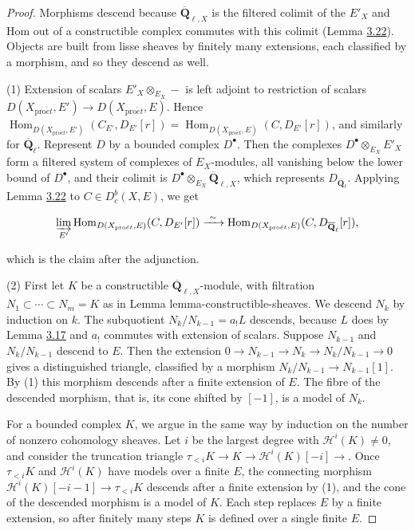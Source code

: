 \documentclass[11pt]{article}
\providecommand{\Dbc}{}\renewcommand{\Dbc}{D^b_c}
\providecommand{\Hom}{}\renewcommand{\Hom}{\operatorname{Hom}}
\providecommand{\QbarX}{}\renewcommand{\QbarX}{\overline{\mathbf Q}_{\ell,X}}
\begin{document}
\begin{proof}[{Proof}]\label{bp74}%
Morphisms descend because \(\QbarX\) is the filtered colimit of the \(E'_X\) and Hom out of a constructible complex commutes with this colimit (Lemma \hyperref[bp68]{3.22}). Objects are built from lisse sheaves by finitely many extensions, each classified by a morphism, and so they descend as well.

(1) Extension of scalars \(E'_X\otimes_{E_X}-\) is left adjoint to restriction of scalars \(D(X_{\mathrm{pro}\acute{e}t},E')\to D(X_{\mathrm{pro}\acute{e}t},E)\). Hence \(\Hom_{D(X_{\mathrm{pro}\acute{e}t},E')}(C_{E'},D_{E'}[r])=\Hom_{D(X_{\mathrm{pro}\acute{e}t},E)}(C,D_{E'}[r])\), and similarly for \(\overline{\mathbf Q}_\ell\). Represent \(D\) by a bounded complex \(D^\bullet\). Then the complexes \(D^\bullet\otimes_{E_X}E'_X\) form a filtered system of complexes of \(E_X\)-modules, all vanishing below the lower bound of \(D^\bullet\), and their colimit is \(D^\bullet\otimes_{E_X}\QbarX\), which represents \(D_{\overline{\mathbf Q}_\ell}\). Applying Lemma \hyperref[bp68]{3.22} to \(C\in\Dbc(X,E)\), we get

\[
\varinjlim_{E'}\Hom_{D(X_{\mathrm{pro}\acute{e}t},E)}(C,D_{E'}[r])
\xrightarrow{\ \sim\ }\Hom_{D(X_{\mathrm{pro}\acute{e}t},E)}(C,D_{\overline{\mathbf Q}_\ell}[r]),
\]

which is the claim after the adjunction.

(2) First let \(K\) be a constructible \(\QbarX\)-module, with filtration \(N_1\subset\cdots\subset N_m=K\) as in Lemma lemma-constructible-sheaves. We descend \(N_k\) by induction on \(k\). The subquotient \(N_k/N_{k-1}=a_!L\) descends, because \(L\) does by Lemma \hyperref[bp53]{3.17} and \(a_!\) commutes with extension of scalars. Suppose \(N_{k-1}\) and \(N_k/N_{k-1}\) descend to \(E\). Then the extension \(0\to N_{k-1}\to N_k\to N_k/N_{k-1}\to0\) gives a distinguished triangle, classified by a morphism \(N_k/N_{k-1}\to N_{k-1}[1]\). By (1) this morphism descends after a finite extension of \(E\). The fibre of the descended morphism, that is, its cone shifted by \([-1]\), is a model of \(N_k\).

For a bounded complex \(K\), we argue in the same way by induction on the number of nonzero cohomology sheaves. Let \(i\) be the largest degree with \(\mathcal H^i(K)\neq0\), and consider the truncation triangle \(\tau_{<i}K\to K\to\mathcal H^i(K)[-i]\to\). Once \(\tau_{<i}K\) and \(\mathcal H^i(K)\) have models over a finite \(E\), the connecting morphism \(\mathcal H^i(K)[-i-1]\to\tau_{<i}K\) descends after a finite extension by (1), and the cone of the descended morphism is a model of \(K\). Each step replaces \(E\) by a finite extension, so after finitely many steps \(K\) is defined over a single finite \(E\).
\end{proof}
\end{document}
